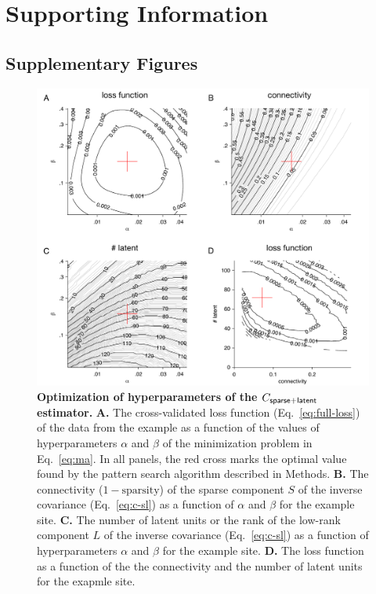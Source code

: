 \documentclass[10pt]{article}
\begin{document}
\section*{Supporting Information}
\subsection*{Supplementary Figures}
\setcounter{figure}{0}
\renewcommand{\figurename}{Figure S}

\begin{figure}[!ht]
\begin{center}
\includegraphics{./figures/Supp01.pdf}
\end{center}
\caption{
	{\bf Optimization of hyperparameters of the $C_{\sf sparse+latent}$ estimator.}  
	{\bf A.} The cross-validated loss function (Eq.~\ref{eq:full-loss}) of the data from the example as a function of the values of hyperparameters $\alpha$ and $\beta$ of the minimization problem in Eq.~\ref{eq:ma}. In all panels, the red cross marks the optimal value found by the pattern search algorithm described in Methods.
	{\bf B.} The connectivity ($1-\mbox{sparsity}$) of the sparse component $S$ of the inverse covariance (Eq.~\ref{eq:c-sl}) as a function of $\alpha$ and $\beta$ for the example site.
	{\bf C.} The number of latent units or the rank of the low-rank component $L$ of the inverse covariance (Eq.~\ref{eq:c-sl}) as a function of hyperparameters $\alpha$ and $\beta$ for the example site.
	{\bf D.} The loss function as a function of the the connectivity and the number of latent units for the exapmle site.
}
\end{figure}
\end{document}
